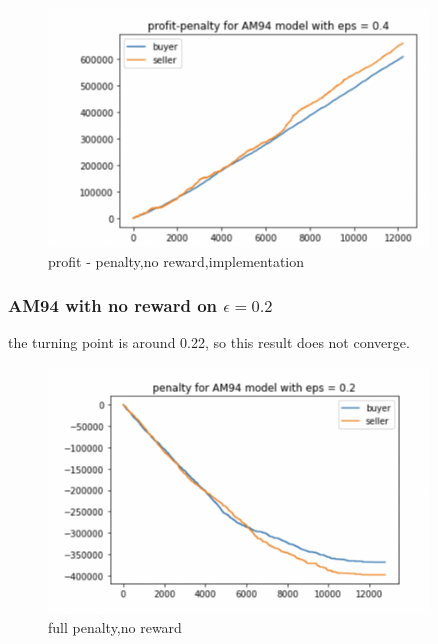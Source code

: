 \documentclass[11pt]{article}
\begin{document}
\begin{figure}[H]
	\begin{center}
	\includegraphics[width=0.9\textwidth]{30.PNG}
	\end{center}
	\caption{profit - penalty,no reward,implementation}
	\label{FIG.30}
\end{figure}


\subsubsection{AM94 with no reward on $\epsilon = 0.2$}
the turning point is around 0.22, so this result does not converge.

\begin{figure}[H]
	\begin{center}
	\includegraphics[width=0.9\textwidth]{31.PNG}
	\end{center}
	\caption{full penalty,no reward}
	\label{FIG.31}
\end{figure}
\end{document}
